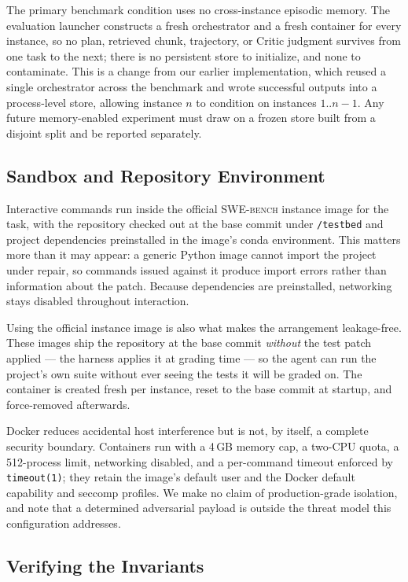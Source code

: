 \documentclass[journal]{IEEEtran}
\newcommand{\swebench}{\textsc{SWE-bench}}
\begin{document}
The primary benchmark condition uses no cross-instance episodic memory. The evaluation launcher constructs a fresh orchestrator and a fresh container for every instance, so no plan, retrieved chunk, trajectory, or Critic judgment survives from one task to the next; there is no persistent store to initialize, and none to contaminate. This is a change from our earlier implementation, which reused a single orchestrator across the benchmark and wrote successful outputs into a process-level store, allowing instance $n$ to condition on instances $1..n-1$. Any future memory-enabled experiment must draw on a frozen store built from a disjoint split and be reported separately.

\subsection{Sandbox and Repository Environment}

Interactive commands run inside the official \swebench{} instance image for the task, with the repository checked out at the base commit under \texttt{/testbed} and project dependencies preinstalled in the image's conda environment. This matters more than it may appear: a generic Python image cannot import the project under repair, so commands issued against it produce import errors rather than information about the patch. Because dependencies are preinstalled, networking stays disabled throughout interaction.

Using the official instance image is also what makes the arrangement leakage-free. These images ship the repository at the base commit \emph{without} the test patch applied — the harness applies it at grading time — so the agent can run the project's own suite without ever seeing the tests it will be graded on. The container is created fresh per instance, reset to the base commit at startup, and force-removed afterwards.

Docker reduces accidental host interference but is not, by itself, a complete security boundary. Containers run with a 4\,GB memory cap, a two-CPU quota, a 512-process limit, networking disabled, and a per-command timeout enforced by \texttt{timeout(1)}; they retain the image's default user and the Docker default capability and seccomp profiles. We make no claim of production-grade isolation, and note that a determined adversarial payload is outside the threat model this configuration addresses.

\subsection{Verifying the Invariants}
\label{sec:verification}
\end{document}
